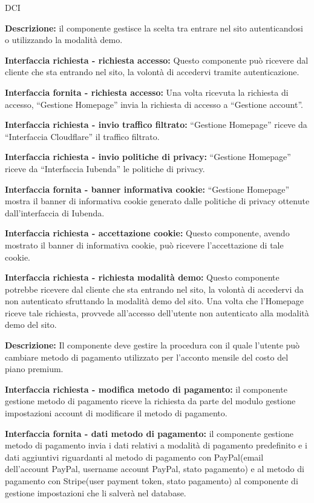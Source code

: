 \begin{listaPersonale}{DCI}

    \textbf{Descrizione:} il componente gestisce la scelta tra entrare nel sito autenticandosi o utilizzando la modalità demo.

    \textbf{Interfaccia richiesta - richiesta accesso:} Questo componente può ricevere dal cliente che sta entrando nel sito, la volontà di accedervi tramite autenticazione.

    \textbf{Interfaccia fornita - richiesta accesso:} Una volta ricevuta la richiesta di accesso, “Gestione Homepage” invia la richiesta di accesso a “Gestione account”.

    \textbf{Interfaccia richiesta - invio traffico filtrato:} “Gestione Homepage” riceve da “Interfaccia Cloudflare” il traffico filtrato.

    \textbf{Interfaccia richiesta - invio politiche di privacy:} “Gestione Homepage” riceve da “Interfaccia Iubenda” le politiche di privacy.

    \textbf{Interfaccia fornita - banner informativa cookie:} “Gestione Homepage” mostra il banner di informativa cookie generato dalle politiche di privacy ottenute dall'interfaccia di Iubenda.

    \textbf{Interfaccia richiesta - accettazione cookie:} Questo componente, avendo mostrato il banner di informativa cookie, può ricevere l'accettazione di tale cookie.

    \textbf{Interfaccia richiesta - richiesta modalità demo:} Questo componente potrebbe ricevere dal cliente che sta entrando nel sito, la volontà di accedervi da non autenticato sfruttando la modalità demo del sito. Una volta che l'Homepage riceve tale richiesta, provvede all'accesso dell'utente non autenticato alla modalità demo del sito.



    \textbf{Descrizione:} Il componente deve gestire la procedura con il quale l'utente può cambiare metodo di pagamento utilizzato per l'acconto mensile del costo del piano premium.

    \textbf{Interfaccia richiesta - modifica metodo di pagamento:} il componente gestione metodo di pagamento riceve la richiesta da parte del modulo gestione impostazioni account di modificare il metodo di pagamento.

    \textbf{Interfaccia fornita - dati metodo di pagamento:} il componente gestione metodo di pagamento invia i dati relativi a modalità di pagamento predefinito e i dati aggiuntivi riguardanti al metodo di pagamento con PayPal(email dell'account PayPal, username account PayPal, stato pagamento) e al metodo di pagamento con Stripe(user payment token, stato pagamento) al componente di gestione impostazioni che li salverà nel database.


\end{listaPersonale}
